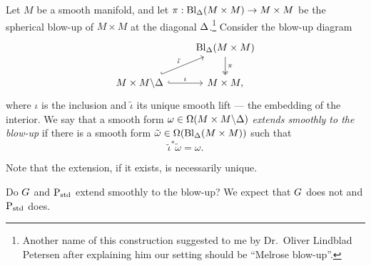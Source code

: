 \documentclass[\MainFolder/Text.tex]{subfiles}
\begin{document}
\begin{Definition}\label{Def:Esdas}
Let $M$ be a smooth manifold, and let $\pi: \mathrm{Bl}_\Delta(M\times M)\rightarrow M\times M$ be the spherical blow-up of $M\times M$ at the diagonal $\Delta$.\footnote{Another name of this construction suggested to me by Dr.~Oliver Lindblad Petersen after explaining him our setting should be ``Melrose blow-up''.} Consider the blow-up diagram
\[\begin{tikzcd}
 & \Bl_\Diag(M\times M)\arrow[two heads]{d}{\pi} \\
 M\times M\backslash \Diag \arrow[hook]{r}{\iota}\arrow[hook]{ru}{\tilde{\iota}} & M\times M,
\end{tikzcd}\]
where $\iota$ is the inclusion and $\tilde{\iota}$ its unique smooth lift --- the embedding of the interior. We say that a smooth form $\omega\in\Omega(M\times M\backslash\Delta)$ \emph{extends smoothly to the blow-up} if there is a smooth form $\tilde{\omega}\in \Omega(\mathrm{Bl}_\Delta(M\times M))$ such that 
$$ \tilde{\iota}^*\tilde{\omega}=\omega. $$
\end{Definition}

Note that the extension, if it exists, is necessarily unique.

\begin{Question}
Do $G$ and $\mathrm{P}_{\mathrm{std}}$ extend smoothly to the blow-up?
We expect that $G$ does not and $\mathrm{P}_{\mathrm{std}}$ does.
\end{Question}
\end{document}
